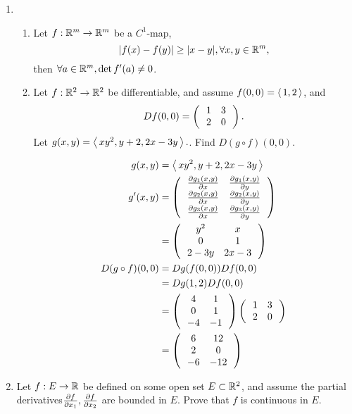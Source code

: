 \documentclass[10pt,a4paper]{report}
\newcommand{\BLUE}[1]{\textcolor{blue}{#1}}
\begin{document}
\begin{enumerate}[label=\Roman*.]
\newpage
\item \begin{enumerate}[label=(\alph*)]

	\item Let $f: \mathbb{R}^m \to \mathbb{R}^m$ be a $C^1$-map,$$ |f(x)-f(y)|\ge |x-y|, \forall x,y \in \mathbb{R}^m,$$ then $\forall a \in \mathbb{R}^m, \det f'(a) \ne 0$.
	
	\item Let $f: \mathbb{R}^2\to \mathbb{R}^2$ be differentiable, and assume $f(0,0)=\left \langle\, 1,2 \,\right \rangle$, and $$ Df(0,0)=\left (\,  \begin{array}{c c} 1&3 \\ 2 & 0 \end{array}  \,\right ).$$ Let $g(x,y)=\left \langle\, xy^2, y+2, 2x-3y \,\right \rangle.$.  Find $D(g\circ f)(0,0)$.

	\BLUE{\begin{align*}
		g(x,y)&=\left \langle\, xy^2, y+2, 2x-3y \,\right \rangle \\
		g'(x,y) &= \left (\, \begin{array}{cc}
			\frac{\partial g_1(x,y)}{\partial x} & \frac{\partial  g_1(x,y)}{\partial y} \\
			\frac{\partial g_2(x,y)}{\partial x} & \frac{\partial  g_2(x,y)}{\partial y} \\
			\frac{\partial g_3(x,y)}{\partial x} & \frac{\partial g_3(x,y)}{\partial y} \\
		\end{array}		  \,\right )\\
		&= \left (\, \begin{array}{cc}
			y^2 & x \\
			0 & 1 \\
			2-3y & 2x-3
		\end{array}
		 \,\right )\\
		D(g \circ f)(0,0) &= Dg(f(0,0))Df(0,0) \\
		&= Dg(1,2)Df(0,0) \\
		&= \left (\, \begin{array}{cc}
				4 & 1 \\
				0 & 1 \\
				-4 & -1
			\end{array}		  \,\right )\left (\,  \begin{array}{c c} 1&3 \\ 2 & 0 \end{array}  \,\right ) \\
		&= \left (\, \begin{array}{cc}
			6 & 12 \\
			2 & 0 \\
			-6 & -12	
		\end{array}		  \,\right )
	\end{align*}
	}
		
\end{enumerate}

\newpage
	\item Let $f:E\to \mathbb{R}$ be defined on some open set $E \subset \mathbb{R}^2$, and assume the partial derivatives$\frac{\partial f}{\partial x_1}, \frac{\partial f}{\partial x_2}$ are bounded in $E$.  Prove that $f$ is continuous in $E$.
	

\end{enumerate}
\end{document}
